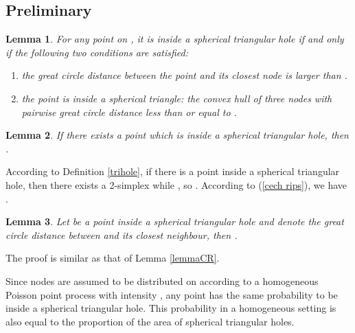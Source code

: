 \documentclass[journal, twoside]{IEEEtran}
\newtheorem{lemma}{Lemma}
\begin{document}
\subsection{Preliminary} \label{secboundpre}
\begin{lemma} \label{condition} For any point on , it
  is inside a spherical triangular hole if and only if the following two conditions are 
  satisfied:
  \begin{enumerate}
  \item the great circle distance between the point and its closest node is
    larger than .
  \item the point is inside a spherical triangle: the convex hull of three nodes with
  pairwise great circle distance less than or equal to .
  \end{enumerate}
\end{lemma}

\begin{lemma} \label{distance} If there exists a point  which
  is inside a spherical triangular hole, then . 
\end{lemma}

\begin{IEEEproof}
According to Definition \ref{trihole}, if there is a point  inside a spherical 
triangular hole, then there exists a 2-simplex 
while , so  
.
According to (\ref{cech rips}), we have .
\end{IEEEproof}

\begin{lemma} \label{closedist} Let  be a point inside a spherical triangular hole
  and  denote the great circle distance between  and its closest neighbour, then
  .
\end{lemma}

The proof is similar as that of Lemma \ref{lemmaCR}.


Since nodes are assumed to be distributed on  according to 
a homogeneous Poisson point process with intensity , any point
has the same probability to be inside a spherical triangular hole. 
This probability in a homogeneous setting is also equal to
the proportion of the area of spherical triangular holes. 
\end{document}
